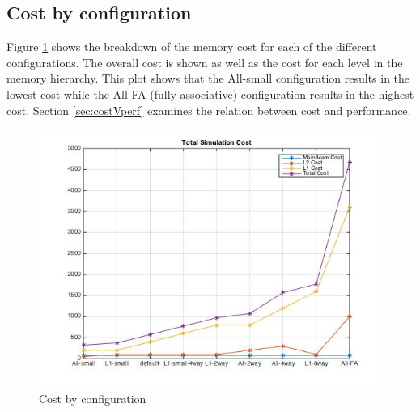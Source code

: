 \documentclass[11pt,titlepage]{article}
\begin{document}
\subsection{Cost by configuration}
Figure \ref{fig:totCost} shows the breakdown of the memory cost for each of the different configurations. The overall cost is shown as well as the cost for each level in the memory hierarchy. This plot shows that the All-small configuration results in the lowest cost while the All-FA (fully associative) configuration results in the highest cost. Section \ref{sec:costVperf} examines the relation between cost and performance.
\begin{figure}[H]
  \centering
  \includegraphics[scale=0.75]{totalCost}
  \caption{Cost by configuration}
  \label{fig:totCost}
\end{figure}
\end{document}
